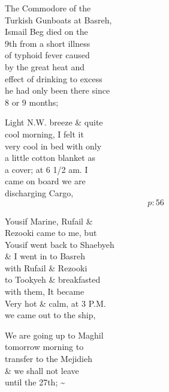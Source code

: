\documentclass{report}
\begin{document}
	\par{
 	The Commodore of the\ \\Turkish Gunboats at Basreh,\ \\Ismail Beg died on the\ \\9th from a short illness\ \\of typhoid fever caused\ \\by the great heat and\ \\effect of drinking to excess\ \\he had only been there since\ \\8 or 9 months;\ \\
	}

	\par{
 	Light N.W. breeze \& quite\ \\cool morning, I felt it\ \\very cool in bed with only\ \\a little cotton blanket as\ \\a cover; at 6 1/2 am. I\ \\came on board we are\ \\discharging Cargo,\ \\
  \[p: 56 \]

	}

	\par{
 	Yousif Marine, Rufail \&\ \\Rezooki came to me, but\ \\Yousif went back to Shaebyeh\ \\\& I went in to Basreh\ \\with Rufail \& Rezooki\ \\to Tookyeh \& breakfasted\ \\with them, It became\ \\Very hot \& calm, at 3 P.M.\ \\we came out to the ship,\ \\
	}

	\par{
 	We are going up to Maghil\ \\tomorrow morning to\ \\transfer to the Mejidieh\ \\\& we shall not leave\ \\until the 27th; \~{}\ \\
	}
\end{document}
